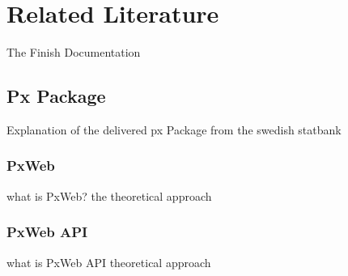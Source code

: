 
\chapter{Related Literature} %

\label{ch:relatedLiterature} %


The Finish Documentation

\section{Px Package}
Explanation of the delivered px Package from the swedish statbank
\subsection{PxWeb}
what is PxWeb? the theoretical approach
\subsection{PxWeb API}
what is PxWeb API theoretical approach 